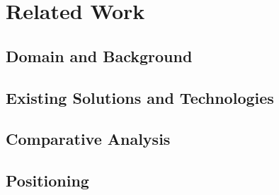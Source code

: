 \section{Related Work}
\label{sec:related-work}

\subsection{Domain and Background}

\subsection{Existing Solutions and Technologies}

\subsection{Comparative Analysis}

\subsection{Positioning}
